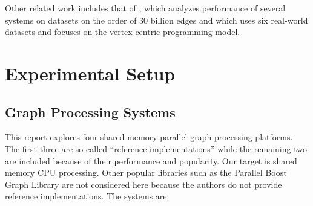 \documentclass{llncs}
\begin{document}
Other related work includes that of \cite{Satish:2014:NavigatingGraph}, which analyzes performance of several systems on datasets on the order of $30$ billion edges and \cite{Lu:2014:ExperimentalEval} which uses six real-world datasets and focuses on the vertex-centric programming model.




\section{Experimental Setup}

\subsection{Graph Processing Systems}

This report explores four shared memory parallel graph processing platforms. The first three are so-called ``reference implementations'' while the remaining two are included because of their performance and popularity. Our target is shared memory CPU processing. Other popular libraries such as the Parallel Boost Graph Library \cite{Gregor:2005:PBGL} are not considered here because the authors do not provide reference implementations. The systems are:
\end{document}
